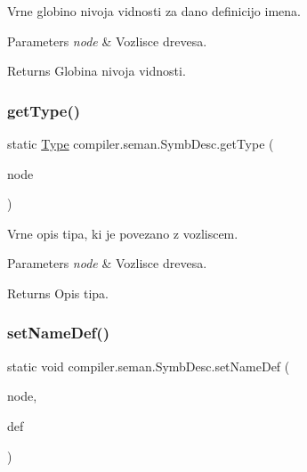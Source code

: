 Vrne globino nivoja vidnosti za dano definicijo imena.


\begin{DoxyParams}{Parameters}
{\em node} & Vozlisce drevesa. \\
\hline
\end{DoxyParams}
\begin{DoxyReturn}{Returns}
Globina nivoja vidnosti. 
\end{DoxyReturn}
\mbox{\label{classcompiler_1_1seman_1_1_symb_desc_a3c812018176730dd85b7bf8e35909786}} 
\subsubsection{\texorpdfstring{get\+Type()}{getType()}}
{\footnotesize\ttfamily static \hyperlink{classcompiler_1_1seman_1_1type_1_1_type}{Type} compiler.\+seman.\+Symb\+Desc.\+get\+Type (\begin{DoxyParamCaption}\item[{\hyperlink{classcompiler_1_1abstr_1_1tree_1_1_abs_tree}{Abs\+Tree}}]{node }\end{DoxyParamCaption})\hspace{0.3cm}{\ttfamily [static]}}

Vrne opis tipa, ki je povezano z vozliscem.


\begin{DoxyParams}{Parameters}
{\em node} & Vozlisce drevesa. \\
\hline
\end{DoxyParams}
\begin{DoxyReturn}{Returns}
Opis tipa. 
\end{DoxyReturn}
\mbox{\label{classcompiler_1_1seman_1_1_symb_desc_aeccc247afebdb4b5ee21b701ffbe026a}} 
\subsubsection{\texorpdfstring{set\+Name\+Def()}{setNameDef()}}
{\footnotesize\ttfamily static void compiler.\+seman.\+Symb\+Desc.\+set\+Name\+Def (\begin{DoxyParamCaption}\item[{\hyperlink{classcompiler_1_1abstr_1_1tree_1_1_abs_tree}{Abs\+Tree}}]{node,  }\item[{\hyperlink{classcompiler_1_1abstr_1_1tree_1_1def_1_1_abs_def}{Abs\+Def}}]{def }\end{DoxyParamCaption})\hspace{0.3cm}{\ttfamily [static]}}


